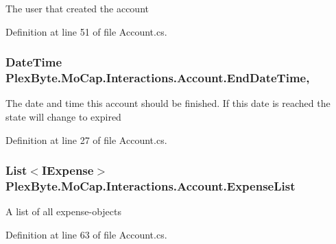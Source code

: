The user that created the account 



Definition at line 51 of file Account.\+cs.

\subsubsection[{\texorpdfstring{End\+Date\+Time}{EndDateTime}}]{\setlength{\rightskip}{0pt plus 5cm}Date\+Time Plex\+Byte.\+Mo\+Cap.\+Interactions.\+Account.\+End\+Date\+Time\hspace{0.3cm}{\ttfamily [get]}, {\ttfamily [set]}}\hypertarget{class_plex_byte_1_1_mo_cap_1_1_interactions_1_1_account_a15dfe505b42a142c4a4fc0ec93ab7fba}{}\label{class_plex_byte_1_1_mo_cap_1_1_interactions_1_1_account_a15dfe505b42a142c4a4fc0ec93ab7fba}


The date and time this account should be finished. If this date is reached the state will change to expired 



Definition at line 27 of file Account.\+cs.

\subsubsection[{\texorpdfstring{Expense\+List}{ExpenseList}}]{\setlength{\rightskip}{0pt plus 5cm}List$<${\bf I\+Expense}$>$ Plex\+Byte.\+Mo\+Cap.\+Interactions.\+Account.\+Expense\+List\hspace{0.3cm}{\ttfamily [get]}}\hypertarget{class_plex_byte_1_1_mo_cap_1_1_interactions_1_1_account_a01eaa284f3668b214462e51ef13b7fd8}{}\label{class_plex_byte_1_1_mo_cap_1_1_interactions_1_1_account_a01eaa284f3668b214462e51ef13b7fd8}


A list of all expense-\/objects 



Definition at line 63 of file Account.\+cs.

